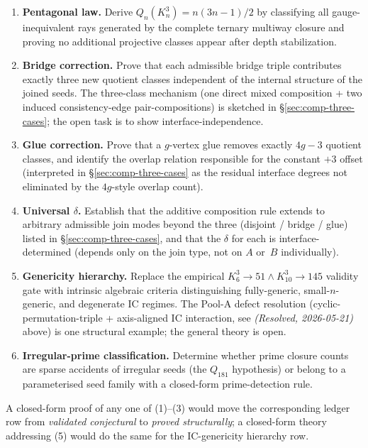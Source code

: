 \documentclass[12pt,a4paper]{article}
\theoremstyle{definition}
\theoremstyle{remark}
\newcommand{\Kn}{K_n^3}
\newcommand{\Qn}{Q_n}
\begin{document}
\begin{enumerate}\setlength{\itemsep}{4pt}
\item \textbf{Pentagonal law.} Derive
  $\Qn(\Kn) = n(3n{-}1)/2$ by classifying all gauge-inequivalent rays
  generated by the complete ternary multiway closure and proving no
  additional projective classes appear after depth stabilization.
\item \textbf{Bridge correction.} Prove that each admissible bridge
  triple contributes exactly three new quotient classes independent
  of the internal structure of the joined seeds. The three-class
  mechanism (one direct mixed composition + two induced
  consistency-edge pair-compositions) is sketched in
  \S\ref{sec:comp-three-cases}; the open task is to show
  interface-independence.
\item \textbf{Glue correction.} Prove that a $g$-vertex glue removes
  exactly $4g - 3$ quotient classes, and identify the overlap
  relation responsible for the constant $+3$ offset (interpreted in
  \S\ref{sec:comp-three-cases} as the residual interface degrees not
  eliminated by the $4g$-style overlap count).
\item \textbf{Universal $\delta$.} Establish that the additive
  composition rule extends to arbitrary admissible join modes beyond
  the three (disjoint / bridge / glue) listed in
  \S\ref{sec:comp-three-cases}, and that the $\delta$ for each is
  interface-determined (depends only on the join type, not on $A$
  or~$B$ individually).
\item \textbf{Genericity hierarchy.} Replace the empirical
  $K_6^3 \to 51 \wedge K_{10}^3 \to 145$ validity gate with intrinsic
  algebraic criteria distinguishing fully-generic, small-$n$-generic,
  and degenerate IC regimes. The Pool-A defect resolution
  (cyclic-permutation-triple + axis-aligned IC interaction, see
  \emph{(Resolved, 2026-05-21)} above) is one structural example;
  the general theory is open.
\item \textbf{Irregular-prime classification.} Determine whether
  prime closure counts are sparse accidents of irregular seeds (the
  $Q_{181}$ hypothesis) or belong to a parameterised seed family with
  a closed-form prime-detection rule.
\end{enumerate}

A closed-form proof of any one of (1)--(3) would move the corresponding
ledger row from \emph{validated conjectural} to
\emph{proved structurally}; a closed-form theory addressing (5) would
do the same for the IC-genericity hierarchy row.
\end{document}
